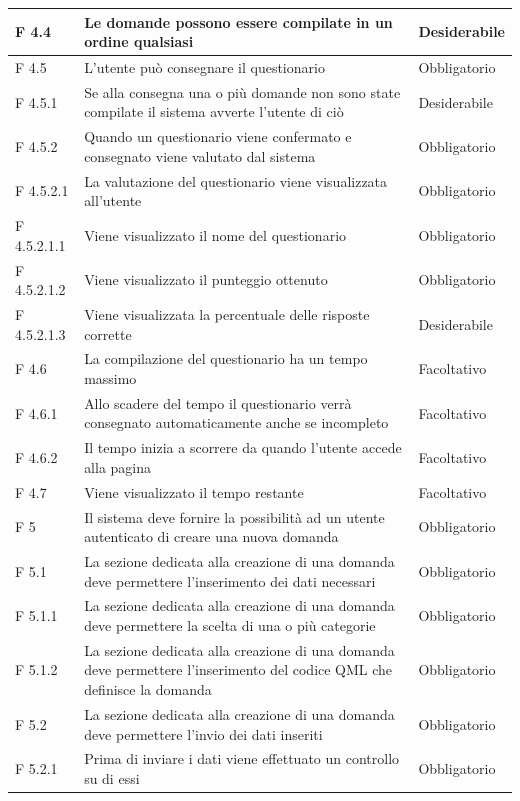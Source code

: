 \documentclass[a4paper,11pt]{article}
\begin{document}
\begin{longtable}{p{}p{}p{}}
\midrule
F 4.4 & Le domande possono essere compilate in un ordine qualsiasi & Desiderabile\\
\midrule
F 4.5 & L'utente può consegnare il questionario & Obbligatorio\\
\midrule
F 4.5.1 & Se alla consegna una o più domande non sono state compilate il sistema avverte l'utente di ciò & Desiderabile\\
\midrule
F 4.5.2 & Quando un questionario viene confermato e consegnato viene valutato dal sistema & Obbligatorio\\
\midrule
F 4.5.2.1 & La valutazione del questionario viene visualizzata all'utente & Obbligatorio\\
\midrule
F 4.5.2.1.1 & Viene visualizzato il nome del questionario & Obbligatorio\\
\midrule
F 4.5.2.1.2 & Viene visualizzato il punteggio ottenuto & Obbligatorio\\
\midrule
F 4.5.2.1.3 & Viene visualizzata la percentuale delle risposte corrette & Desiderabile\\
\midrule
F 4.6 & La compilazione del questionario ha un tempo massimo & Facoltativo\\
\midrule
F 4.6.1 & Allo scadere del tempo il questionario verrà consegnato automaticamente anche se incompleto & Facoltativo\\
\midrule
F 4.6.2 & Il tempo inizia a scorrere da quando l'utente accede alla pagina & Facoltativo\\
\midrule
F 4.7 & Viene visualizzato il tempo restante & Facoltativo\\
\midrule
F 5 & Il sistema deve fornire la possibilità ad un utente autenticato di creare una nuova domanda & Obbligatorio\\
\midrule
F 5.1 & La sezione dedicata alla creazione di una domanda deve permettere l'inserimento dei dati necessari & Obbligatorio\\
\midrule
F 5.1.1 & La sezione dedicata alla creazione di una domanda deve permettere la scelta di una o più categorie & Obbligatorio\\
\midrule
F 5.1.2 & La sezione dedicata alla creazione di una domanda deve permettere l'inserimento del codice QML che definisce la domanda & Obbligatorio\\
\midrule
F 5.2 & La sezione dedicata alla creazione di una domanda deve permettere l'invio dei dati inseriti & Obbligatorio\\
\midrule
F 5.2.1 & Prima di inviare i dati viene effettuato un controllo su di essi & Obbligatorio\\

\end{longtable}
\end{document}
